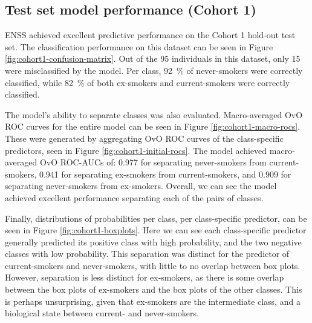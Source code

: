 \documentclass{article} %
\begin{document}

\newpage
\subsection{Test set model performance (Cohort 1)} \label{sec:cohort1-performance}
ENSS achieved excellent predictive performance on the Cohort 1 hold-out test set. The classification performance on this dataset can be seen in Figure \ref{fig:cohort1-confusion-matrix}. Out of the 95 individuals in this dataset, only 15 were misclassified by the model. Per class, \SI{92}{\percent} of never-smokers were correctly classified, while \SI{82}{\percent} of both ex-smokers and current-smokers were correctly classified.

The model's ability to separate classes was also evaluated. Macro-averaged OvO ROC curves for the entire model can be seen in Figure \ref{fig:cohort1-macro-rocs}. These were generated by aggregating OvO ROC curves of the class-specific predictors, seen in Figure \ref{fig:cohort1-initial-rocs}. The model achieved macro-averaged OvO ROC-AUCs of: 0.977 for separating never-smokers from current-smokers, 0.941 for separating ex-smokers from current-smokers, and 0.909 for separating never-smokers from ex-smokers. Overall, we can see the model achieved excellent performance separating each of the pairs of classes.

Finally, distributions of probabilities per class, per class-specific predictor, can be seen in Figure \ref{fig:cohort1-boxplots}. Here we can see each class-specific predictor generally predicted its positive class with high probability, and the two negative classes with low probability. This separation was distinct for the predictor of current-smokers and never-smokers, with little to no overlap between box plots. However, separation is less distinct for ex-smokers, as there is some overlap between the box plots of ex-smokers and the box plots of the other classes. This is perhaps unsurprising, given that ex-smokers are the intermediate class, and a biological state between current- and never-smokers.
\end{document}
